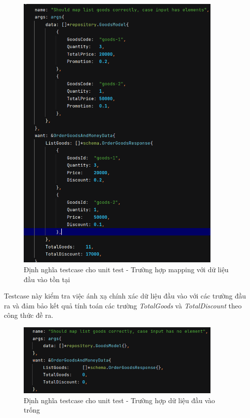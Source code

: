 \newpage

\begin{figure}[!htp]
    \begin{center}
        \includegraphics[width=10cm]{img/testing/unit_tc1.PNG}
    \end{center}
    \caption{Định nghĩa testcase cho unit test - Trường hợp mapping với dữ liệu đầu vào tồn tại}
\end{figure}


Testcase này kiểm tra việc ánh xạ chính xác dữ liệu đầu vào với các trường đầu ra và đảm bảo kết quả tính toán các trường \emph{TotalGoods} và \emph{TotalDiscount} theo công thức đề ra.\\


\begin{figure}[!htp]
    \begin{center}
        \includegraphics[width=10cm]{img/testing/unit_tc2.PNG}
    \end{center}
    \caption{Định nghĩa testcase cho unit test - Trường hợp dữ liệu đầu vào trống}
\end{figure}

